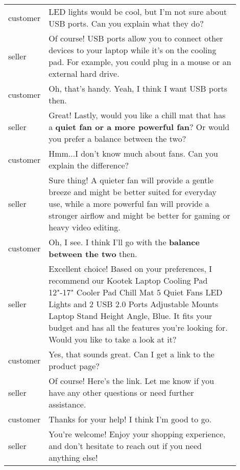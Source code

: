 \begin{table*}[t]
\begin{center}
\begin{tabular}{l p{0.9\linewidth} }
customer & LED lights would be cool, but I'm not sure about USB ports. Can you explain what they do?\\\hdashline
seller & Of course! USB ports allow you to connect other devices to your laptop while it's on the cooling pad. For example, you could plug in a mouse or an external hard drive.\\\hdashline
customer & Oh, that's handy. Yeah, I think I want USB ports then.\\\hdashline
seller & Great! Lastly, would you like a chill mat that has a \textbf{quiet fan or a more powerful fan}? Or would you prefer a balance between the two?\\\hdashline
customer & Hmm...I don't know much about fans. Can you explain the difference?\\\hdashline
seller & Sure thing! A quieter fan will provide a gentle breeze and might be better suited for everyday use, while a more powerful fan will provide a stronger airflow and might be better for gaming or heavy video editing.\\\hdashline
customer & Oh, I see. I think I'll go with the \textbf{balance between the two} then.\\\hdashline
seller & Excellent choice! Based on your preferences, I recommend our Kootek Laptop Cooling Pad 12"-17" Cooler Pad Chill Mat 5 Quiet Fans LED Lights and 2 USB 2.0 Ports Adjustable Mounts Laptop Stand Height Angle, Blue. It fits your budget and has all the features you're looking for. Would you like to take a look at it?\\\hdashline
customer & Yes, that sounds great. Can I get a link to the product page?\\\hdashline
seller & Of course! Here's the link. Let me know if you have any other questions or need further assistance.\\\hdashline
customer & Thanks for your help! I think I'm good to go.\\\hdashline
seller & You're welcome! Enjoy your shopping experience, and don't hesitate to reach out if you need anything else! \\
    \hline
    \end{tabular}
    \caption{Not instruction-following example by LLaMA2-70B-Chat single-pass generation. The only assigned required feature is the manufacturer of Kootek, and the only unwanted feature is white color.} \label{tab:not_instruction_following}
\end{center}
\end{table*}

